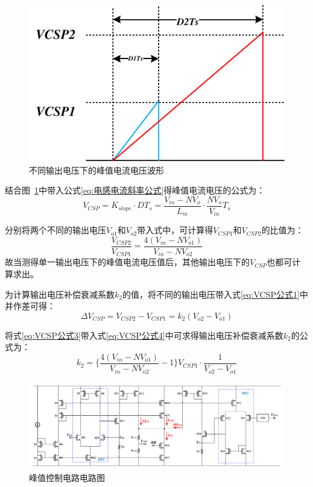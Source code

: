 \begin{figure}[htbp] 
    \centering
    \includegraphics[width=0.6\linewidth]{figures/峰值电流控制1.pdf}
    \caption{不同输出电压下的峰值电流电压波形}
    \label{fig:峰值电流控制1}
\end{figure}

结合图~\ref{fig:峰值电流控制1}中带入公式\eqref{eq:电感电流斜率公式}得峰值电流电压的公式为：
\begin{equation}
    \label{eq:VCSP公式2}
     V_{CSP} = K_{slope} \cdot DT_s = \frac{V_{in} - N V_o}{L_m} \cdot \frac{N V_o}{V_{in}} T_s
\end{equation}

分别将两个不同的输出电压$V_{o1}$和$V_{o2}$带入式中，可计算得$V_{CSP1}$和$V_{CSP2}$的比值为：
\begin{equation}
    \label{eq:VCSP公式3}
    \frac{V_{CSP2}}{V_{CSP1}} = \frac{4 (V_{in} - NV_{o1})}{V_{in} - NV_{o2}}
\end{equation}
故当测得单一输出电压下的峰值电流电压值后，其他输出电压下的$V_{CSP}$也都可计算求出。

为计算输出电压补偿衰减系数$k_2$的值，将不同的输出电压带入式\eqref{eq:VCSP公式1}中并作差可得：
\begin{equation}
    \label{eq:VCSP公式4}
    \varDelta V_{CSP} = V_{CSP2}-V_{CSP1} = k_2 (V_{o2} - V_{o1})
\end{equation}

将式\eqref{eq:VCSP公式3}带入式\eqref{eq:VCSP公式4}中可求得输出电压补偿衰减系数$k_2$的公式为：
\begin{equation}
    \label{eq:k2公式}
    k_2 = \{ \frac{4 (V_{in} - NV_{o1})}{V_{in} - NV_{o2}} - 1 \} V_{CSP1} \cdot \frac{1}{V_{o2} - V_{o1}}
\end{equation}

\begin{figure}[htbp] 
    \centering
    \includegraphics[width=1.0\linewidth]{figures/峰值控制电路图.pdf}
    \caption{峰值控制电路电路图}
    \label{fig:峰值控制电路图}
\end{figure}

